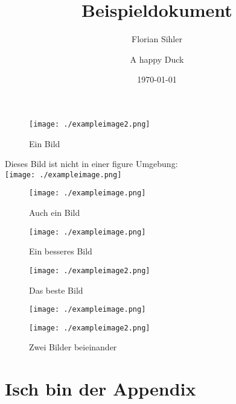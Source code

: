 \documentclass{article}
\title{Beispieldokument}
\author{Florian Sihler \and A happy Duck}
\date{\today}
\begin{document}
\maketitle

\listoffigures

\begin{figure}
    \texttt{[image: ./exampleimage2.png]}
    \caption{Ein Bild}
\end{figure}

Dieses Bild ist nicht in einer figure Umgebung:\bigskip\\
\texttt{[image: ./exampleimage.png]}

\begin{figure}[t]
    \texttt{[image: ./exampleimage.png]}
    \caption{Auch ein Bild}
\end{figure}

\blinddocument

\begin{figure}[t]
    \texttt{[image: ./exampleimage.png]}
    \caption{Ein besseres Bild}
\end{figure}


\begin{figure}[t]
    \texttt{[image: ./exampleimage2.png]}
    \caption{Das beste Bild}
\end{figure}


\begin{figure}[t]
    \begin{minipage}[t]{0.48\linewidth}
        \texttt{[image: ./exampleimage.png]}
    \end{minipage}
    \begin{minipage}[t]{0.48\linewidth}
        \texttt{[image: ./exampleimage2.png]}
    \end{minipage}
    \caption{Zwei Bilder beieinander}
\end{figure}

\blindtext

\clearpage\appendix
\section{Isch bin der Appendix}

\mirrorimages
\end{document}
